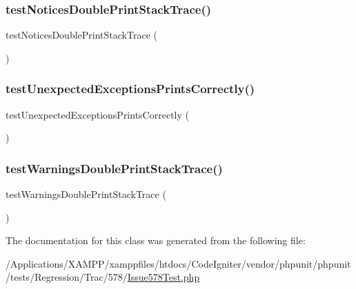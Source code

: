 \subsubsection{\texorpdfstring{test\+Notices\+Double\+Print\+Stack\+Trace()}{testNoticesDoublePrintStackTrace()}}
{\footnotesize\ttfamily test\+Notices\+Double\+Print\+Stack\+Trace (\begin{DoxyParamCaption}{ }\end{DoxyParamCaption})}

\mbox{\label{class_issue578_test_a791655035657b903ce8ada462e6ebd27}} 
\subsubsection{\texorpdfstring{test\+Unexpected\+Exceptions\+Prints\+Correctly()}{testUnexpectedExceptionsPrintsCorrectly()}}
{\footnotesize\ttfamily test\+Unexpected\+Exceptions\+Prints\+Correctly (\begin{DoxyParamCaption}{ }\end{DoxyParamCaption})}

\mbox{\label{class_issue578_test_a98402aa7e9d05ef5275d79341ed10c00}} 
\subsubsection{\texorpdfstring{test\+Warnings\+Double\+Print\+Stack\+Trace()}{testWarningsDoublePrintStackTrace()}}
{\footnotesize\ttfamily test\+Warnings\+Double\+Print\+Stack\+Trace (\begin{DoxyParamCaption}{ }\end{DoxyParamCaption})}



The documentation for this class was generated from the following file\+:\begin{DoxyCompactItemize}
\item 
/\+Applications/\+X\+A\+M\+P\+P/xamppfiles/htdocs/\+Code\+Igniter/vendor/phpunit/phpunit/tests/\+Regression/\+Trac/578/\mbox{\hyperlink{_issue578_test_8php}{Issue578\+Test.\+php}}\end{DoxyCompactItemize}
